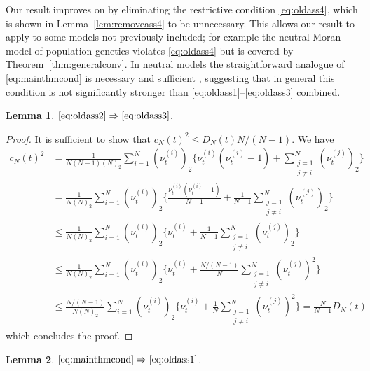 \documentclass{article}
\newtheorem{lemma}{Lemma}
\theoremstyle{definition}
\newcommand{\1}[1]{\mathbbm{1}_{\{#1\}}}
\begin{document}
Our result improves on \citet{koskela2018} by eliminating the restrictive condition \eqref{eq:oldass4}, which is shown in Lemma~\ref{lem:removeass4} to be unnecessary. This allows our result to apply to some models not previously included; for example the neutral Moran model of population genetics violates \eqref{eq:oldass4} but is covered by Theorem~\ref{thm:generalconv}. 
In neutral models the straightforward analogue of \eqref{eq:mainthmcond} is necessary and sufficient \citep[Theorem 5.4]{mohle2003}, suggesting that in general this condition is not significantly stronger than \eqref{eq:oldass1}--\eqref{eq:oldass3} combined.

\begin{lemma} \label{lem:removeass3}
$\eqref{eq:oldass2} \Rightarrow \eqref{eq:oldass3}$.
\end{lemma}

\begin{proof}
It is sufficient to show that $c_N( t )^2 \leq D_N( t ) N/(N-1)$.
We have
\begin{align*}
c_N( t )^2 &= \frac{ 1 }{ N ( N - 1 ) ( N )_2 } \sum_{ i = 1 }^N ( \nu_t^{(i)})_2 \Bigg\{ \nu_t^{(i)} ( \nu_t^{(i)} - 1 ) + \sum_{\substack{j=1\\ j \neq i }}^N ( \nu_t^{(j)} )_2 \Bigg\} \\
&= \frac{ 1 }{ N ( N )_2 } \sum_{ i = 1 }^N ( \nu_t^{(i)} )_2 \Bigg\{ \frac{ \nu_t^{(i)} ( \nu_t^{(i)} - 1 ) }{ N - 1 } + \frac{ 1 }{ N - 1 } \sum_{\substack{j=1\\ j \neq i }}^N ( \nu_t^{(j)} )_2 \Bigg\} \\
&\leq \frac{ 1 }{ N ( N )_2 } \sum_{ i = 1 }^N ( \nu_t^{(i)})_2 \Bigg\{ \nu_t^{(i)} + \frac{ 1 }{ N - 1 } \sum_{\substack{j=1\\ j \neq i }}^N ( \nu_t^{(j)} )_2 \Bigg\} \\
&\leq \frac{ 1 }{ N ( N )_2 } \sum_{ i = 1 }^N ( \nu_t^{(i)})_2 \Bigg\{ \nu_t^{(i)} + \frac{ N / ( N - 1 ) }{ N } \sum_{\substack{j=1\\ j \neq i }}^N ( \nu_t^{(j)} )^2 \Bigg\} \\
&\leq \frac{ N / ( N - 1 ) }{ N ( N )_2 } \sum_{ i = 1 }^N ( \nu_t^{(i)})_2 \Bigg\{ \nu_t^{(i)} + \frac{ 1 }{ N } \sum_{\substack{j=1\\ j \neq i }}^N ( \nu_t^{(j)} )^2 \Bigg\} = \frac{ N }{ N - 1 } D_N( t )
\end{align*}
which concludes the proof.
\end{proof}

\begin{lemma} \label{lem:removeass1}
$\eqref{eq:mainthmcond} \Rightarrow \eqref{eq:oldass1}$.
\end{lemma}
\end{document}

